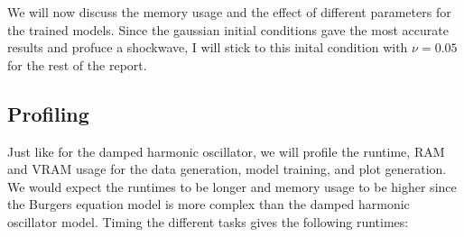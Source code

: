 \documentclass[we,twoside,openright,a4paper,11pt]{uantwerpenbamathesis}
\begin{document}
We will now discuss the memory usage and the effect of different parameters for the trained models. Since the gaussian initial conditions gave the most accurate results and profuce a shockwave, I will stick to this inital condition with $\nu=0.05$ for the rest of the report.\\

\subsection{Profiling}
Just like for the damped harmonic oscillator, we will profile the runtime, RAM and VRAM usage for the data generation, model training, and plot generation. We would expect the runtimes to be longer and memory usage to be higher since the Burgers equation model is more complex than the damped harmonic oscillator model. Timing the different tasks gives the following runtimes:
\end{document}
